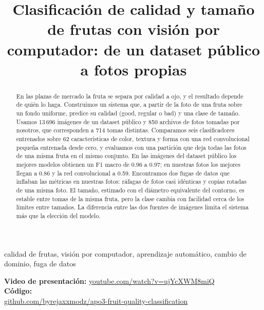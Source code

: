 \documentclass[conference]{IEEEtran}
\begin{document}
\title{Clasificación de calidad y tamaño de frutas con visión por computador: de un dataset público a fotos propias}

\author{
\and
{}
}

\maketitle

\begin{abstract}
En las plazas de mercado la fruta se separa por calidad a ojo, y el resultado depende de quién lo haga. Construimos un sistema que, a partir de la foto de una fruta sobre un fondo uniforme, predice su calidad (good, regular o bad) y una clase de tamaño. Usamos 13\,696 imágenes de un dataset público y 850 archivos de fotos tomadas por nosotros, que corresponden a 714 tomas distintas. Comparamos seis clasificadores entrenados sobre 62 características de color, textura y forma con una red convolucional pequeña entrenada desde cero, y evaluamos con una partición que deja todas las fotos de una misma fruta en el mismo conjunto. En las imágenes del dataset público los mejores modelos obtienen un F1 macro de 0.96 a 0.97; en nuestras fotos los mejores llegan a 0.86 y la red convolucional a 0.59. Encontramos dos fugas de datos que inflaban las métricas en nuestras fotos: ráfagas de fotos casi idénticas y copias rotadas de una misma foto. El tamaño, estimado con el diámetro equivalente del contorno, es estable entre tomas de la misma fruta, pero la clase cambia con facilidad cerca de los límites entre tamaños. La diferencia entre las dos fuentes de imágenes limita el sistema más que la elección del modelo.
\end{abstract}

\begin{IEEEkeywords}
calidad de frutas, visión por computador, aprendizaje automático, cambio de dominio, fuga de datos
\end{IEEEkeywords}

{\small\raggedright\noindent\textbf{Video de presentación:} \href{https://www.youtube.com/watch?v=ujYcXWM8miQ}{youtube.com/watch?v=ujYcXWM8miQ}\\
\textbf{Código:}\\
\href{https://github.com/byrejaxxmodz/apo3-fruit-quality-classification}{github.com/byrejaxxmodz/apo3-fruit-quality-classification}\par}
\end{document}
